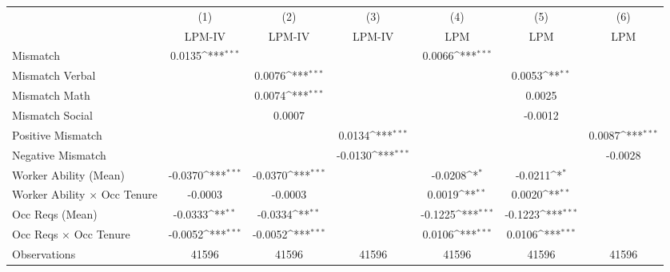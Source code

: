 {
\def\sym#1{\ifmmode^{#1}\else\(^{#1}\)\fi}
\begin{tabular}{l*{6}{c}}
\hline  
                    &\multicolumn{1}{c}{(1)}&\multicolumn{1}{c}{(2)}&\multicolumn{1}{c}{(3)}&\multicolumn{1}{c}{(4)}&\multicolumn{1}{c}{(5)}&\multicolumn{1}{c}{(6)}\\
                    &\multicolumn{1}{c}{LPM-IV}&\multicolumn{1}{c}{LPM-IV}&\multicolumn{1}{c}{LPM-IV}&\multicolumn{1}{c}{LPM}&\multicolumn{1}{c}{LPM}&\multicolumn{1}{c}{LPM}\\
\hline  
Mismatch            &      0.0135\sym{***}&                     &                     &      0.0066\sym{***}&                     &                     \\
[1em]
Mismatch Verbal     &                     &      0.0076\sym{***}&                     &                     &      0.0053\sym{**} &                     \\
[1em]
Mismatch Math       &                     &      0.0074\sym{***}&                     &                     &      0.0025         &                     \\
[1em]
Mismatch Social     &                     &      0.0007         &                     &                     &     -0.0012         &                     \\
[1em]
Positive Mismatch   &                     &                     &      0.0134\sym{***}&                     &                     &      0.0087\sym{***}\\
[1em]
Negative Mismatch   &                     &                     &     -0.0130\sym{***}&                     &                     &     -0.0028         \\
[1em]
Worker Ability (Mean)&     -0.0370\sym{***}&     -0.0370\sym{***}&                     &     -0.0208\sym{*}  &     -0.0211\sym{*}  &                     \\
[1em]
Worker Ability $\times$ Occ Tenure&     -0.0003         &     -0.0003         &                     &      0.0019\sym{**} &      0.0020\sym{**} &                     \\
[1em]
Occ Reqs (Mean)     &     -0.0333\sym{**} &     -0.0334\sym{**} &                     &     -0.1225\sym{***}&     -0.1223\sym{***}&                     \\
[1em]
Occ Reqs $\times$ Occ Tenure&     -0.0052\sym{***}&     -0.0052\sym{***}&                     &      0.0106\sym{***}&      0.0106\sym{***}&                     \\
\hline  
Observations        &       41596         &       41596         &       41596         &       41596         &       41596         &       41596         \\
\hline  
\end{tabular}
}
